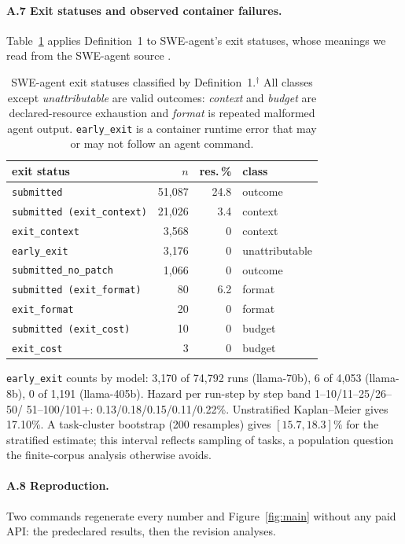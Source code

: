 \documentclass[letterpaper]{article} %
\newcommand{\rev}{$^{\dagger}$}
\begin{document}
\paragraph{A.7 Exit statuses and observed container failures.}
Table~\ref{tab:exit} applies Definition~1 to SWE-agent's exit statuses, whose
meanings we read from the SWE-agent source \citep{sweagent2024code}.

\begin{table}[h]
\centering
\footnotesize
\setlength{\tabcolsep}{1.8pt}
\begin{tabular}{@{}lrrl@{}}
\toprule
exit status & $n$ & res.\,\% & class \\
\midrule
\texttt{submitted} & 51{,}087 & 24.8 & outcome \\
\texttt{submitted (exit\_context)} & 21{,}026 & 3.4 & context \\
\texttt{exit\_context} & 3{,}568 & 0 & context \\
\texttt{early\_exit} & 3{,}176 & 0 & unattributable \\
\texttt{submitted\_no\_patch} & 1{,}066 & 0 & outcome \\
\texttt{submitted (exit\_format)} & 80 & 6.2 & format \\
\texttt{exit\_format} & 20 & 0 & format \\
\texttt{submitted (exit\_cost)} & 10 & 0 & budget \\
\texttt{exit\_cost} & 3 & 0 & budget \\
\bottomrule
\end{tabular}
\caption{SWE-agent exit statuses classified by Definition~1.\rev{} All
classes except \emph{unattributable} are valid outcomes: \emph{context} and
\emph{budget} are declared-resource exhaustion and \emph{format} is repeated
malformed agent output. \texttt{early\_exit} is a container runtime error that
may or may not follow an agent command.}
\label{tab:exit}
\end{table}

\noindent\texttt{early\_exit} counts by
model: 3{,}170 of 74{,}792 runs (llama-70b), 6 of 4{,}053 (llama-8b), 0 of
1{,}191 (llama-405b). Hazard per run-step by step band 1--10/11--25/26--50/
51--100/101+: 0.13/0.18/0.15/0.11/0.22\%. Unstratified Kaplan--Meier gives
17.10\%. A task-cluster bootstrap (200 resamples) gives $[15.7,18.3]\%$ for the
stratified estimate; this interval reflects sampling of tasks, a population
question the finite-corpus analysis otherwise avoids.

\paragraph{A.8 Reproduction.} Two commands regenerate every number and
Figure~\ref{fig:main} without any paid API: the predeclared results, then the
revision analyses.
\end{document}
